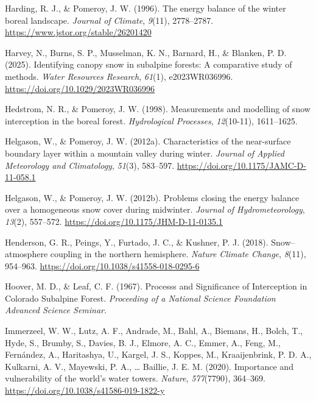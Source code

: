 \documentclass[
]{agujournal2019}
\newlength{\cslhangindent}
\newenvironment{CSLReferences}[2] %
 {\begin{list}{}{%
  \setlength{\itemindent}{0pt}
  \setlength{\leftmargin}{0pt}
  \setlength{\parsep}{0pt}
  \ifodd #1
   \setlength{\leftmargin}{\cslhangindent}
   \setlength{\itemindent}{-1\cslhangindent}
  \fi
  \setlength{\itemsep}{#2\baselineskip}}}
 {\end{list}}
\begin{document}
\begin{CSLReferences}{1}{0}
Harding, R. J., \& Pomeroy, J. W. (1996). The energy balance of the
winter boreal landscape. \emph{Journal of Climate}, \emph{9}(11),
2778--2787. \url{https://www.jstor.org/stable/26201420}

Harvey, N., Burns, S. P., Musselman, K. N., Barnard, H., \& Blanken, P.
D. (2025). Identifying canopy snow in subalpine forests: A comparative
study of methods. \emph{Water Resources Research}, \emph{61}(1),
e2023WR036996. \url{https://doi.org/10.1029/2023WR036996}

Hedstrom, N. R., \& Pomeroy, J. W. (1998). Measurements and modelling of
snow interception in the boreal forest. \emph{Hydrological Processes},
\emph{12}(10-11), 1611--1625.

Helgason, W., \& Pomeroy, J. W. (2012a). Characteristics of the
near-surface boundary layer within a mountain valley during winter.
\emph{Journal of Applied Meteorology and Climatology}, \emph{51}(3),
583--597. \url{https://doi.org/10.1175/JAMC-D-11-058.1}

Helgason, W., \& Pomeroy, J. W. (2012b). Problems closing the energy
balance over a homogeneous snow cover during midwinter. \emph{Journal of
Hydrometeorology}, \emph{13}(2), 557--572.
\url{https://doi.org/10.1175/JHM-D-11-0135.1}

Henderson, G. R., Peings, Y., Furtado, J. C., \& Kushner, P. J. (2018).
Snow--atmosphere coupling in the northern hemisphere. \emph{Nature
Climate Change}, \emph{8}(11), 954--963.
\url{https://doi.org/10.1038/s41558-018-0295-6}

Hoover, M. D., \& Leaf, C. F. (1967). Processs and {Significance} of
{Interception} in {Colorado Subalpine Forest}. \emph{Proceeding of a
{National Science Foundation Advanced Science Seminar}}.

Immerzeel, W. W., Lutz, A. F., Andrade, M., Bahl, A., Biemans, H.,
Bolch, T., Hyde, S., Brumby, S., Davies, B. J., Elmore, A. C., Emmer,
A., Feng, M., Fernández, A., Haritashya, U., Kargel, J. S., Koppes, M.,
Kraaijenbrink, P. D. A., Kulkarni, A. V., Mayewski, P. A., \ldots{}
Baillie, J. E. M. (2020). Importance and vulnerability of the world's
water towers. \emph{Nature}, \emph{577}(7790), 364--369.
\url{https://doi.org/10.1038/s41586-019-1822-y}


\end{CSLReferences}
\end{document}
